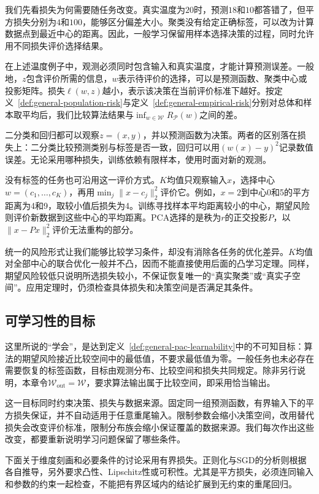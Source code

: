 我们先看损失为何需要随任务改变。真实温度为$20$时，预测$18$和$10$都答错了，但平方损失分别为$4$和$100$，能够区分偏差大小。聚类没有给定正确标签，可以改为计算数据点到最近中心的距离。因此，一般学习保留用样本选择决策的过程，同时允许用不同损失评价选择结果。

在上述温度例子中，观测必须同时包含输入和真实温度，才能计算预测误差。一般地，$z$包含评价所需的信息，$w$表示待评价的选择，可以是预测函数、聚类中心或投影矩阵。损失$\ell(w,z)$越小，表示该决策在当前评价标准下越好。按定义~\ref{def:general-population-risk}与定义~\ref{def:general-empirical-risk}分别对总体和样本取平均后，我们比较算法结果与$\inf_{w\in\mathcal W}R_{\mathcal P}(w)$之间的差。

二分类和回归都可以观察$z=(x,y)$，并以预测函数为决策。两者的区别落在损失上：二分类比较预测类别与标签是否一致，回归可以用$(w(x)-y)^2$记录数值误差。无论采用哪种损失，训练依赖有限样本，使用时面对新的观测。

没有标签的任务也可沿用这一评价方式。$K$均值只观察输入$x$，选择中心$w=(c_1,\ldots,c_K)$，再用$\min_j\|x-c_j\|_2^2$评价它。例如，$x=2$到中心0和5的平方距离为4和9，取较小值后损失为4。训练寻找样本平均距离较小的中心，期望风险则评价新数据到这些中心的平均距离。PCA选择的是秩为$r$的正交投影$P$，以$\|x-Px\|_2^2$评价无法重构的部分。

统一的风险形式让我们能够比较学习条件，却没有消除各任务的优化差异。$K$均值对全部中心的联合优化一般并不凸，因而不能直接使用后面的凸学习定理。同样，期望风险较低只说明所选损失较小，不保证恢复唯一的“真实聚类”或“真实子空间”。应用定理时，仍须检查具体损失和决策空间是否满足其条件。

\subsection{可学习性的目标}

这里所说的“学会”，是达到定义~\ref{def:general-pac-learnability}中的不可知目标：算法的期望风险接近比较空间中的最低值，不要求最低值为零。一般任务也未必存在需要恢复的标签函数，目标由观测分布、比较空间和损失共同规定。除非另行说明，本章令$\mathcal W_{\mathrm{out}}=\mathcal W$，要求算法输出属于比较空间，即采用恰当输出。

这一目标同时约束决策、损失与数据来源。固定同一组预测函数，有界输入下的平方损失保证，并不自动适用于任意重尾输入。限制参数会缩小决策空间，改用替代损失会改变评价标准，限制分布族会缩小保证覆盖的数据来源。我们每次作出这些改变，都要重新说明学习问题保留了哪些条件。

下面关于维度刻画和必要条件的讨论采用有界损失。正则化与SGD的分析则根据各自推导，另外要求凸性、Lipschitz性或可积性。尤其是平方损失，必须连同输入和参数的约束一起检查，不能把有界区域内的结论扩展到无约束的重尾回归。

